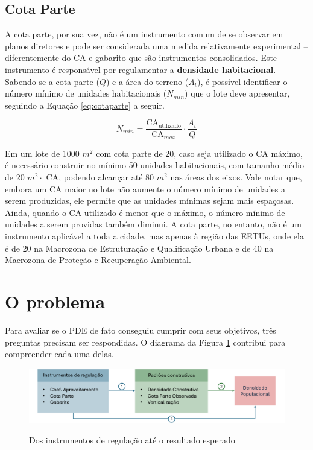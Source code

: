 \subsection*{Cota Parte}

A cota parte, por sua vez, não é um instrumento comum de se observar em planos diretores e pode ser considerada uma medida relativamente experimental -- diferentemente do CA e gabarito que são instrumentos consolidados. Este instrumento é responsável por regulamentar a \textbf{densidade habitacional}. Sabendo-se a cota parte ($Q$) e a área do terreno ($A_t$), é possível identificar o número mínimo de unidades habitacionais ($N_{min}$) que o lote deve apresentar, seguindo a Equação \ref{eq:cotaparte} a seguir. 

\begin{equation}
    N_{min} = \frac{\text{CA}_{\text{utilizado}}}{\text{CA}_{max}}\cdot \frac{A_t}{Q}
    \label{eq:cotaparte}
\end{equation}


Em um lote de 1000 $m^2$ com cota parte de 20, caso seja utilizado o CA máximo, é necessário construir no mínimo 50 unidades habitacionais, com tamanho médio de 20 $m^2 \cdot$ CA, podendo alcançar até 80 $m^2$ nas áreas dos eixos. Vale notar que, embora um CA maior no lote não aumente o número mínimo de unidades a serem produzidas, ele permite que as unidades mínimas sejam mais espaçosas. Ainda, quando o CA utilizado é menor que o máximo, o número mínimo de unidades a serem providas também diminui. A cota parte, no entanto, não é um instrumento aplicável a toda a cidade, mas apenas à região das EETUs, onde ela é de 20 na Macrozona de Estruturação e Qualificação Urbana e de 40 na Macrozona de Proteção e Recuperação Ambiental.

\section{O problema}
\label{sec:problema}

Para avaliar se o PDE de fato conseguiu cumprir com seus objetivos, três preguntas precisam ser respondidas. O diagrama da Figura \ref{fig:diagrama} contribui para compreender cada uma delas.

\begin{figure}[h]
    \caption{Dos instrumentos de regulação até o resultado esperado}
    \includegraphics[width = \linewidth]{figuras/desenho_proposta.pdf}
    \label{fig:diagrama}
\end{figure}

